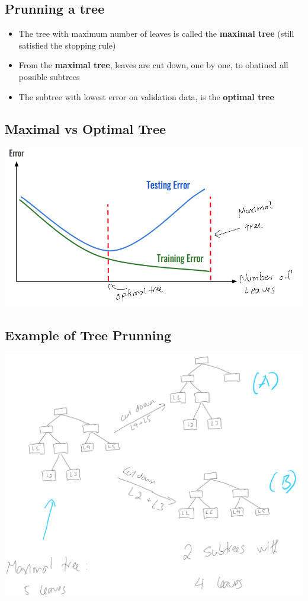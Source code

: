 \documentclass[
]{article}
\providecommand{\tightlist}{%
  \setlength{\itemsep}{0pt}\setlength{\parskip}{0pt}}
\begin{document}
\hypertarget{prunning-a-tree-1}{%
\subsection{Prunning a tree}\label{prunning-a-tree-1}}

\begin{itemize}
\tightlist
\item
  The tree with maximum number of leaves is called the \textbf{maximal
  tree} (still satisfied the stopping rule)
\item
  From the \textbf{maximal tree}, leaves are cut down, one by one, to
  obatined all possible subtrees
\item
  The subtree with lowest error on validation data, is the
  \textbf{optimal tree}
\end{itemize}

\hypertarget{maximal-vs-optimal-tree}{%
\subsection{Maximal vs Optimal Tree}\label{maximal-vs-optimal-tree}}

\includegraphics{images/tree7.png}

\hypertarget{example-of-tree-prunning}{%
\subsection{Example of Tree Prunning}\label{example-of-tree-prunning}}

\includegraphics{images/tree8.png}
\end{document}
